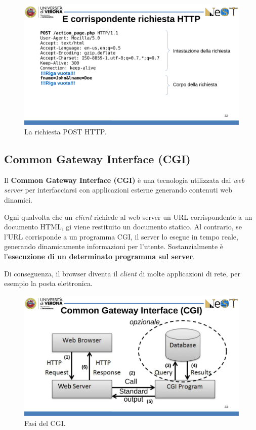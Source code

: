 \documentclass[a4paper]{article}
\begin{document}
	\begin{figure}[!htp]
		\centering
		\includegraphics[width=\textwidth]{img/richiesta_post.pdf}
		\caption{La richiesta POST HTTP.}
	\end{figure}\newpage

	\subsection{Common Gateway Interface (CGI)}
	
	Il \textcolor{Red3}{\textbf{Common Gateway Interface (CGI)}} è una tecnologia utilizzata dai \emph{web server} per interfacciarsi con applicazioni esterne generando contenuti web dinamici.\newline
	
	\noindent
	Ogni qualvolta che un \emph{client} richiede al web server un URL corrispondente a un documento HTML, gi viene restituito un documento statico. Al contrario, se l'URL corrisponde a un programma CGI, il server lo esegue in tempo reale, generando dinamicamente informazioni per l'utente. Sostanzialmente è l'\textbf{esecuzione di un determinato programma sul server}.
	
	Di conseguenza, il browser diventa il \emph{client} di molte applicazioni di rete, per esempio la posta elettronica.
	
	\begin{figure}[!htp]
		\centering
		\includegraphics[width=\textwidth]{img/CGI.pdf}
		\caption{Fasi del CGI.}
	\end{figure}
\end{document}
